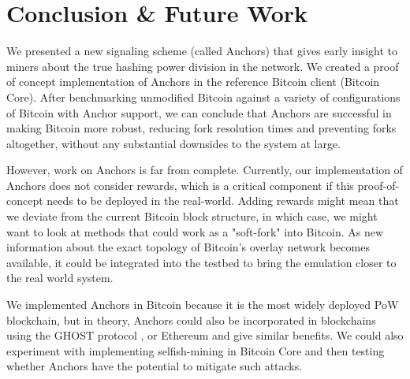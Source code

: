 \chapter{Conclusion \& Future Work} \label{ch-conclusion}

We presented a new signaling scheme (called Anchors) that gives early insight to miners about the true hashing power division in the network.
We created a proof of concept implementation of Anchors in the reference Bitcoin client (Bitcoin Core).
After benchmarking unmodified Bitcoin against a variety of configurations of Bitcoin with Anchor support, we can conclude that Anchors are successful in making Bitcoin more robust, reducing fork resolution times and preventing forks altogether, without any substantial downsides to the system at large. 

However, work on Anchors is far from complete. 
Currently, our implementation of Anchors does not consider rewards, which is a critical component if this proof-of-concept needs to be deployed in the real-world.
Adding rewards might mean that we deviate from the current Bitcoin block structure, in which case, we might want to look at methods that could work as a "soft-fork" into Bitcoin.
As new information about the exact topology of Bitcoin's overlay network becomes available, it could be integrated into the testbed to bring the emulation closer to the real world system.


We implemented Anchors in Bitcoin because it is the most widely deployed PoW blockchain, but in theory, Anchors could also be incorporated in blockchains using the GHOST protocol \cite{GHOST}, or Ethereum \cite{EthereumOriginal} and give similar benefits.
We could also experiment with implementing selfish-mining \cite{selfishmining} in Bitcoin Core and then testing whether Anchors have the potential to mitigate such attacks.
